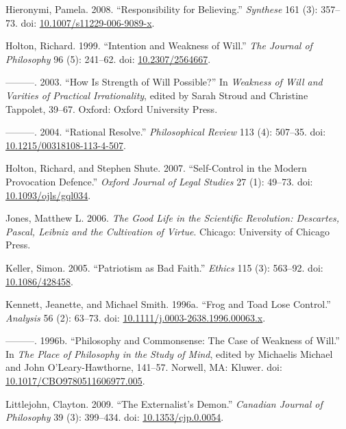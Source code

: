 \documentclass[
  10pt,
  letterpaper,
  DIV=11,
  numbers=noendperiod,
  twoside]{scrartcl}
\newlength{\cslhangindent}
\newenvironment{CSLReferences}[2] %
 {\begin{list}{}{%
  \setlength{\itemindent}{0pt}
  \setlength{\leftmargin}{0pt}
  \setlength{\parsep}{0pt}
  \ifodd #1
   \setlength{\leftmargin}{\cslhangindent}
   \setlength{\itemindent}{-1\cslhangindent}
  \fi
  \setlength{\itemsep}{#2\baselineskip}}}
 {\end{list}}
\begin{document}
\begin{CSLReferences}{1}{0}
Hieronymi, Pamela. 2008. {``Responsibility for Believing.''}
\emph{Synthese} 161 (3): 357--73. doi:
\href{https://doi.org/10.1007/s11229-006-9089-x}{10.1007/s11229-006-9089-x}.

Holton, Richard. 1999. {``Intention and Weakness of Will.''} \emph{The
Journal of Philosophy} 96 (5): 241--62. doi:
\href{https://doi.org/10.2307/2564667}{10.2307/2564667}.

---------. 2003. {``How Is Strength of Will Possible?''} In
\emph{Weakness of Will and Varities of Practical Irrationality}, edited
by Sarah Stroud and Christine Tappolet, 39--67. Oxford: Oxford
University Press.

---------. 2004. {``Rational Resolve.''} \emph{Philosophical Review} 113
(4): 507--35. doi:
\href{https://doi.org/10.1215/00318108-113-4-507}{10.1215/00318108-113-4-507}.

Holton, Richard, and Stephen Shute. 2007. {``Self-Control in the Modern
Provocation Defence.''} \emph{Oxford Journal of Legal Studies} 27 (1):
49--73. doi:
\href{https://doi.org/10.1093/ojls/gql034}{10.1093/ojls/gql034}.

Jones, Matthew L. 2006. \emph{The Good Life in the Scientific
Revolution: Descartes, Pascal, Leibniz and the Cultivation of Virtue}.
Chicago: University of Chicago Press.

Keller, Simon. 2005. {``Patriotism as Bad Faith.''} \emph{Ethics} 115
(3): 563--92. doi:
\href{https://doi.org/10.1086/428458}{10.1086/428458}.

Kennett, Jeanette, and Michael Smith. 1996a. {``Frog and Toad Lose
Control.''} \emph{Analysis} 56 (2): 63--73. doi:
\href{https://doi.org/10.1111/j.0003-2638.1996.00063.x}{10.1111/j.0003-2638.1996.00063.x}.

---------. 1996b. {``Philosophy and Commonsense: The Case of Weakness of
Will.''} In \emph{The Place of Philosophy in the Study of Mind}, edited
by Michaelis Michael and John O'Leary-Hawthorne, 141--57. Norwell, MA:
Kluwer. doi:
\href{https://doi.org/10.1017/CBO9780511606977.005}{10.1017/CBO9780511606977.005}.

Littlejohn, Clayton. 2009. {``The Externalist's Demon.''} \emph{Canadian
Journal of Philosophy} 39 (3): 399--434. doi:
\href{https://doi.org/10.1353/cjp.0.0054}{10.1353/cjp.0.0054}.


\end{CSLReferences}
\end{document}
